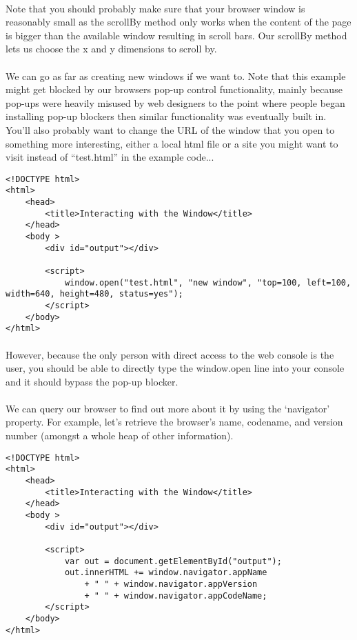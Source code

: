 \documentclass[10pt, a4paper]{article}
\begin{document}
\paragraph{} Note that you should probably make sure that your browser window is reasonably small as the scrollBy method only works when the content of the page is bigger than the available window resulting in scroll bars. Our scrollBy method lets us choose the x and y dimensions to scroll by.

\paragraph{} We can go as far as creating new windows if we want to. Note that this example might get blocked by our browsers pop-up control functionality, mainly because pop-ups were heavily misused by web designers to the point where people began installing pop-up blockers then similar functionality was eventually built in. You'll also probably want to change the URL of the window that you open to something more interesting, either a local html file or a site you might want to visit instead of ``test.html'' in the example code...

\begin{lstlisting}
<!DOCTYPE html>
<html>
    <head>
        <title>Interacting with the Window</title>
    </head>
    <body >
        <div id="output"></div>

        <script>
            window.open("test.html", "new window", "top=100, left=100, width=640, height=480, status=yes");            
        </script>
    </body>
</html>
\end{lstlisting}

\paragraph{} However, because the only person with direct access to the web console is the user, you should be able to directly type the window.open line into your console and it should bypass the pop-up blocker.

\paragraph{} We can query our browser to find out more about it by using the `navigator' property. For example, let's retrieve the browser's name, codename, and version number (amongst a whole heap of other information).

\begin{lstlisting}
<!DOCTYPE html>
<html>
    <head>
        <title>Interacting with the Window</title>
    </head>
    <body >
        <div id="output"></div>

        <script>
            var out = document.getElementById("output");
            out.innerHTML += window.navigator.appName 
                + " " + window.navigator.appVersion 
                + " " + window.navigator.appCodeName;
        </script>
    </body>
</html>
\end{lstlisting}
\end{document}
